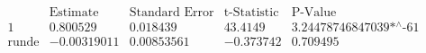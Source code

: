 \[\begin{array}{l|llll}
 \text{} & \text{Estimate} & \text{Standard Error} & \text{t-Statistic} & \text{P-Value} \\
\hline
 1 & 0.800529 & 0.018439 & 43.4149 & \text{3.24478746847039$\grave{ }$*${}^{\wedge}$-61} \\
 \text{runde} & -0.00319011 & 0.00853561 & -0.373742 & 0.709495 \\
\end{array}\]

